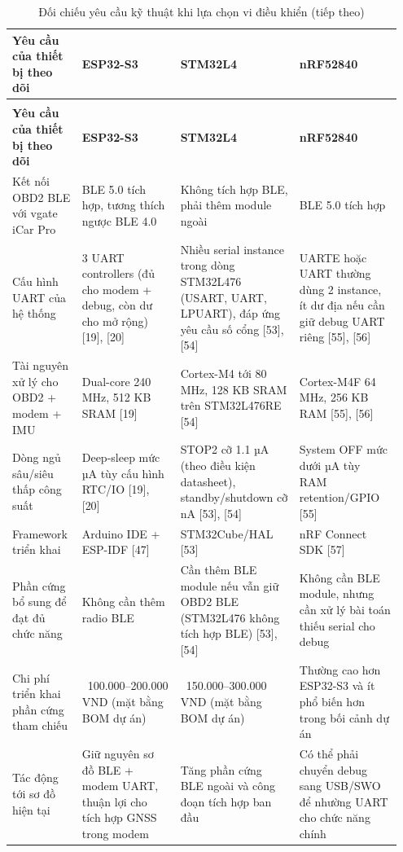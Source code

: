 \documentclass[a4paper]{extarticle}
\newcommand{\thesissettableid}[2]{%
  \renewcommand{\thetable}{#1}%
  \renewcommand{\theHtable}{#2}%
}
\begin{document}
{\thesissettableid{3.1}{tab-ch3-oi-chieu-yeu-cau-ky-thuat-khi-lua-chon-vi-ieu-khien}
\def\LTcaptype{table}
\begin{longtable}{|L{0.153\linewidth}|L{0.247\linewidth}|L{0.299\linewidth}|L{0.255\linewidth}|}
\caption{Đối chiếu yêu cầu kỹ thuật khi lựa chọn vi điều khiển}\label{tab:ch3-oi-chieu-yeu-cau-ky-thuat-khi-lua-chon-vi-ieu-khien}\\
\hline \textbf{Yêu cầu của thiết bị theo dõi} & \textbf{ESP32-S3} & \textbf{STM32L4} & \textbf{nRF52840} \\
\hline
\endfirsthead
\caption[]{Đối chiếu yêu cầu kỹ thuật khi lựa chọn vi điều khiển (tiếp theo)}\\
\hline \textbf{Yêu cầu của thiết bị theo dõi} & \textbf{ESP32-S3} & \textbf{STM32L4} & \textbf{nRF52840} \\
\hline
\endhead
\hline
\endfoot
\endlastfoot
Kết nối OBD2 BLE với vgate iCar Pro & BLE 5.0 tích hợp, tương thích
ngược BLE 4.0 & Không tích hợp BLE, phải thêm module ngoài & BLE 5.0
tích hợp \\\hline
Cấu hình UART của hệ thống & 3 UART controllers (đủ cho modem + debug,
còn dư cho mở rộng) {[}19{]}, {[}20{]} & Nhiều serial instance trong
dòng STM32L476 (USART, UART, LPUART), đáp ứng yêu cầu số cổng {[}53{]},
{[}54{]} & UARTE hoặc UART thường dùng 2 instance, ít dư địa nếu cần giữ
debug UART riêng {[}55{]}, {[}56{]} \\\hline
Tài nguyên xử lý cho OBD2 + modem + IMU & Dual-core 240 MHz, 512 KB SRAM
{[}19{]} & Cortex-M4 tới 80 MHz, 128 KB SRAM trên STM32L476RE {[}54{]} &
Cortex-M4F 64 MHz, 256 KB RAM {[}55{]}, {[}56{]} \\\hline
Dòng ngủ sâu/siêu thấp công suất & Deep-sleep mức µA tùy cấu hình RTC/IO
{[}19{]}, {[}20{]} & STOP2 cỡ 1.1 µA (theo điều kiện datasheet),
standby/shutdown cỡ nA {[}53{]}, {[}54{]} & System OFF mức dưới µA tùy
RAM retention/GPIO {[}55{]} \\\hline
Framework triển khai & Arduino IDE + ESP-IDF {[}47{]} & STM32Cube/HAL
{[}53{]} & nRF Connect SDK {[}57{]} \\\hline
Phần cứng bổ sung để đạt đủ chức năng & Không cần thêm radio BLE & Cần
thêm BLE module nếu vẫn giữ OBD2 BLE (STM32L476 không tích hợp BLE)
{[}53{]}, {[}54{]} & Không cần BLE module, nhưng cần xử lý bài toán
thiếu serial cho debug \\\hline
Chi phí triển khai phần cứng tham chiếu &
~100.000--200.000 VND (mặt bằng BOM dự án) &
~150.000--300.000 VND (mặt bằng BOM dự án) & Thường cao
hơn ESP32-S3 và ít phổ biến hơn trong bối cảnh dự án \\\hline
Tác động tới sơ đồ hiện tại & Giữ nguyên sơ đồ BLE + modem UART, thuận
lợi cho tích hợp GNSS trong modem & Tăng phần cứng BLE ngoài và công
đoạn tích hợp ban đầu & Có thể phải chuyển debug sang USB/SWO để nhường
UART cho chức năng chính \\\hline
\end{longtable}
}
\end{document}
